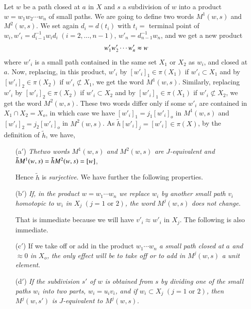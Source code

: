 Let $w$ be a path closed at $a$ in $X$ and $s$ a subdivision
of $w$ into a product $w = w_1 w_2 \cdots w_n$ of small paths. We are
going to define two words $M^1(w,s)$ and $M^2(w,s)$. We set again $d_i
= d(t_i)$ with $t_i =$ terminal point of $w_i, w'_i = d^{-1}_{i-1}
w_i  d_i \; (i=2, \ldots, n-1)$, $w'_n =  d^{-1}_{n-1} w_n$, and we
get a new product  
  $$
  w'_1 w'_2 \cdots w'_n \thickapprox w 
  $$   
  where $w'_i$ is a small path contained in the same set $X_1$ or
  $X_2$ as $w_i$, and closed at $a$. Now, replacing, in this product,
  $w'_i$ by $[w'_i]_1 \in \pi (X_1)$ if $w'_i \subset X_1$ and by
  $[w'_i]_2 \in 
  \pi (X_2)$ if $w'_i  \not\subset X_1$, we get the word $M^1
  (w,s)$. Similarly, replacing $w'_i$ by $[w'_i]_2 \in \pi (X_2)$ if
  $w'_i \subset X_2$ and by $[w'_i]_1 \in \pi (X_1)$ if $w'_i
  \not\subset X_2$, we get the word $M^2(w,s)$. These two words differ
  only if some $w'_i$ are contained in $X_1 \cap X_2 = X_o$, in  which
  case we have $[w'_i]_1 = j_1 [ w'_i]_o$ in $M^1 (w,s)$ and $[w'_i]_2
  = j_2 [ w'_i]_o$ in $M^2 (w,s)$. As $\tilde{h}[w'_i]_j =[w'_i]
  \in \pi (X)$,  by the definition of $\tilde{h}$, we have, 
  \begin{enumerate}
\item[(a$'$)] \textit{The\pageoriginale two words $M^1 (w,s) $ and
  $M^2(w,s)$ are $J$-equivalent and $\tilde{h} M^1\break (w,s)=  \tilde{h}
  M^2 (w,s) = [w]$}, 

Hence $\tilde{h}$ is \textit{surjective}. We have further the 
following properties. 

\item[(b$'$)] \textit{If, in the product $w = w_1 \cdots w_n$ we
  replace $w_i$ by another small path $v_i$ homotopic to $w_i$ in
  $X_j \; (j =1 \text{ or } 2)$, the word $M^j (w,s)$ does not change}. 

That is immediate because we will have $v'_i \approx w'_i$ in
$X_j$. The following is also immediate. 

\item[(c$'$)] If we take off or add in the product $w_1 \cdots w_n$
  \textit{a small path closed at $a$ and $\approx 0$ in $X_o$, the only
    effect will be to take off or to add in $M^j (w,s)$ a unit
    element}. 

\item[(d$'$)] \textit{If the subdivision $s'$ of $w$ is obtained from
  $s$ by dividing one of the small paths $w_i$ into two parts, $w_i =
  u_i v_i$, and if $w_i \subset X_j  \; (j=1 \text{ or } 2)$, then $M^j
  (w,s')$ is $J$-equivalent to $M^j(w,s)$}. 
  \end{enumerate}

